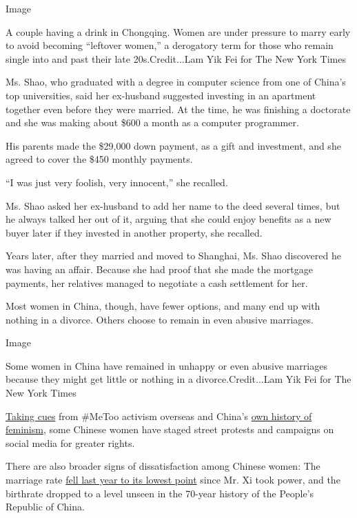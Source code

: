 Image

A couple having a drink in Chongqing. Women are under pressure to marry
early to avoid becoming ``leftover women,'' a derogatory term for those
who remain single into and past their late 20s.Credit...Lam Yik Fei for
The New York Times

Ms. Shao, who graduated with a degree in computer science from one of
China's top universities, said her ex-husband suggested investing in an
apartment together even before they were married. At the time, he was
finishing a doctorate and she was making about \$600 a month as a
computer programmer.

His parents made the \$29,000 down payment, as a gift and investment,
and she agreed to cover the \$450 monthly payments.

``I was just very foolish, very innocent,'' she recalled.

Ms. Shao asked her ex-husband to add her name to the deed several times,
but he always talked her out of it, arguing that she could enjoy
benefits as a new buyer later if they invested in another property, she
recalled.

Years later, after they married and moved to Shanghai, Ms. Shao
discovered he was having an affair. Because she had proof that she made
the mortgage payments, her relatives managed to negotiate a cash
settlement for her.

Most women in China, though, have fewer options, and many end up with
nothing in a divorce. Others choose to remain in even abusive marriages.

Image

Some women in China have remained in unhappy or even abusive marriages
because they might get little or nothing in a divorce.Credit...Lam Yik
Fei for The New York Times

\href{https://www.nytimes.com/2018/07/26/world/asia/china-metoo.html}{Taking
cues} from \#MeToo activism overseas and China's
\href{https://www.nytimes.com/interactive/2018/obituaries/overlooked-qiu-jin.html}{own
history of feminism}, some Chinese women have staged street protests and
campaigns on social media for greater rights.

There are also broader signs of dissatisfaction among Chinese women: The
marriage rate
\href{http://www.xinhuanet.com/politics/2019-04/02/c_1124313756.htm}{fell
last year to its lowest point} since Mr. Xi took power, and the
birthrate dropped to a level unseen in the 70-year history of the
People's Republic of China.

